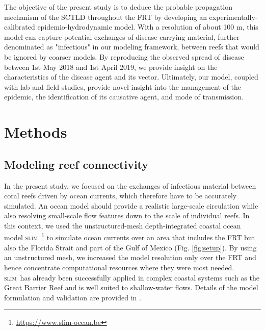 \documentclass[utf8]{frontiersSCNS}
\newcommand{\slim}{\textsc{slim}\ }
\newcommand{\dan}[1]{\textbf{\textcolor{orange}{#1}}}
\begin{document}
The objective of the present study is to deduce the probable propagation mechanism of the SCTLD throughout the FRT by developing an experimentally-calibrated epidemio-hydrodynamic model. With a resolution of about 100 m, this model can capture potential exchanges of disease-carrying material, further denominated as "infectious" in our modeling framework, between reefs that would be ignored by coarser models. By reproducing the observed spread of disease between 1st May 2018 and 1st April 2019, we provide insight on the characteristics of the disease agent and its vector. Ultimately, our model, coupled with lab and field studies, provide novel insight into the management of the epidemic, the identification of its causative agent, and mode of transmission.

\section{Methods}

\subsection{Modeling reef connectivity}
In the present study, we focused on the exchanges of infectious material between coral reefs driven by ocean currents, which therefore have to be accurately simulated. An ocean model should provide a realistic large-scale circulation while also resolving small-scale flow features down to the scale of individual reefs. In this context, we used the unstructured-mesh depth-integrated coastal ocean model \slim\footnote{\url{https://www.slim-ocean.be}} to simulate ocean currents over an area that includes the FRT but also the Florida Strait and part of the Gulf of Mexico (Fig. \ref{fig:setup}). By using an unstructured mesh, we increased the model resolution only over the FRT and hence concentrate computational resources where they were most needed. \slim has already been successfully applied in complex coastal systems such as the Great Barrier Reef \citep{lambrechts2008multi, thomas2014numerical} and is well suited to shallow-water flows. Details of the model formulation and validation are provided in \cite{frys20}. 
\end{document}
